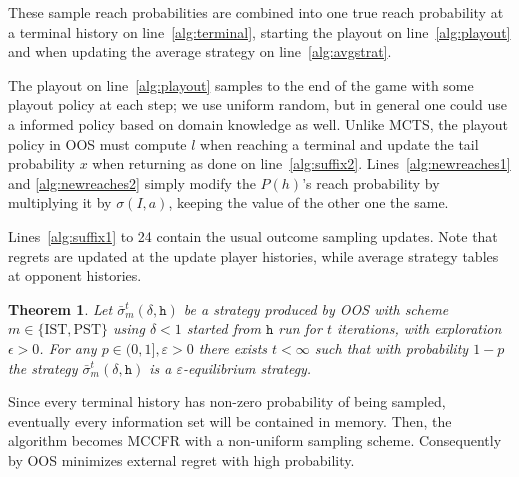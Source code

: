 \documentclass[letterpaper]{article}
\newcommand{\cP}{\mathcal{P}}
\newcommand{\tth}{\mathtt{h}}
\newtheorem{theorem}{Theorem}
\newcounter{mlNoteCounter}
\newcommand{\mlnote}[1]{{\scriptsize \color{darkgreen} $\blacksquare$ \refstepcounter{mlNoteCounter}\textsf{[ML]$_{\arabic{mlNoteCounter}}$:{#1}}}}
\begin{document}
These sample reach probabilities are combined into one true reach probability at a terminal history on line~\ref{alg:terminal}, starting the playout on line~\ref{alg:playout} and when updating the average 
strategy on line~\ref{alg:avgstrat}. 


The playout on line~\ref{alg:playout} samples to the end of the game with some playout policy at each step; we use uniform random, 
but in general one could use a informed policy based on domain knowledge as well. 
Unlike MCTS, the playout policy in OOS must compute $l$ when reaching a terminal and update the tail probability $x$ when returning
as done on line~\ref{alg:suffix2}. Lines~\ref{alg:newreaches1} and \ref{alg:newreaches2} simply modify the $P(h)$'s reach probability 
by multiplying it by $\sigma(I,a)$, keeping the value of the other one the same.

Lines~\ref{alg:suffix1} to 24
contain the usual outcome sampling updates. Note that regrets are updated at the 
update player histories, while average strategy tables at opponent histories. 

\begin{theorem}
Let $\bar{\sigma}^t_m(\delta,\tth)$ be a strategy produced by OOS with scheme $m \in \{ \mbox{IST}, \mbox{PST} \}$ 
using $\delta < 1$ started from $\tth$ run for $t$ iterations, with exploration $\epsilon > 0$.  
For any $p \in (0, 1], \varepsilon > 0$ there exists $t < \infty$ such that with 
probability $1-p$ the strategy  $\bar{\sigma}^t_m(\delta,\tth)$ is a $\varepsilon$-equilibrium strategy. 
\label{thm:consistency}
\end{theorem}
Since every terminal history has non-zero probability of being sampled, eventually every information 
set will be contained in memory. Then, the algorithm becomes MCCFR with a non-uniform sampling scheme.
Consequently by \cite[Theorem 5]{Lanctot09Sampling} OOS minimizes external regret with high probability.
\end{document}
